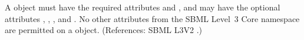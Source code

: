 A \Parameter object must have the required attributes  and
, and may have the optional attributes ,
, ,  and .  No other
attributes from the SBML Level~3 Core namespace are permitted on a
\Parameter object.  (References: SBML L3V2 .)
